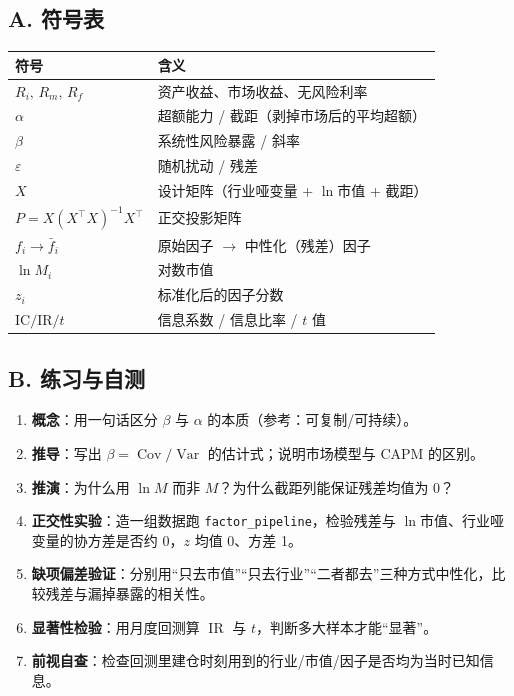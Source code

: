\documentclass[UTF8,11pt]{ctexart}
\newcommand{\codeinl}[1]{\texttt{#1}}
\begin{document}
\subsection*{A. 符号表}
\begin{center}
\renewcommand{\arraystretch}{1.4}
\begin{tabular}{@{}ll@{}}
\toprule
符号 & 含义 \\
\midrule
$R_i,\,R_m,\,R_f$ & 资产收益、市场收益、无风险利率 \\
$\alpha$ & 超额能力 / 截距（剥掉市场后的平均超额） \\
$\beta$ & 系统性风险暴露 / 斜率 \\
$\varepsilon$ & 随机扰动 / 残差 \\
$X$ & 设计矩阵（行业哑变量 + $\ln$市值 + 截距） \\
$P=X(X^{\top}X)^{-1}X^{\top}$ & 正交投影矩阵 \\
$f_i \to \bar f_i$ & 原始因子 $\to$ 中性化（残差）因子 \\
$\ln M_i$ & 对数市值 \\
$z_i$ & 标准化后的因子分数 \\
$\mathrm{IC}/\mathrm{IR}/t$ & 信息系数 / 信息比率 / $t$ 值 \\
\bottomrule
\end{tabular}
\end{center}

\subsection*{B. 练习与自测}
\begin{enumerate}[itemsep=2pt]
\item \textbf{概念}：用一句话区分 $\beta$ 与 $\alpha$ 的本质（参考：可复制/可持续）。
\item \textbf{推导}：写出 $\beta=\operatorname{Cov}/\operatorname{Var}$ 的估计式；说明市场模型与 CAPM 的区别。
\item \textbf{推演}：为什么用 $\ln M$ 而非 $M$？为什么截距列能保证残差均值为 0？
\item \textbf{正交性实验}：造一组数据跑 \codeinl{factor\_pipeline}，检验残差与 $\ln$市值、行业哑变量的协方差是否约 0，$z$ 均值 0、方差 1。
\item \textbf{缺项偏差验证}：分别用“只去市值”“只去行业”“二者都去”三种方式中性化，比较残差与漏掉暴露的相关性。
\item \textbf{显著性检验}：用月度回测算 $\operatorname{IR}$ 与 $t$，判断多大样本才能“显著”。
\item \textbf{前视自查}：检查回测里建仓时刻用到的行业/市值/因子是否均为当时已知信息。
\end{enumerate}
\end{document}

